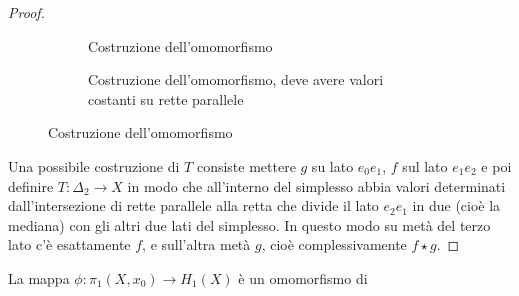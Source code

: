 \begin{proof}
\begin{figure}[htbp]
\begin{subfigure}[htbp]{.45\linewidth}
      \caption{Costruzione dell'omomorfismo}
      \label{fig:lez3:proof_homo_1}
    \end{subfigure}
    \begin{subfigure}[htbp]{.45\linewidth}
      \centering
      \caption{Costruzione dell'omomorfismo, deve avere valori costanti su rette parallele}
      \label{fig:lez3:proof_homo}
    \end{subfigure}
    \caption{Costruzione dell'omomorfismo}
  \end{figure}
  Una possibile costruzione di $ T $ consiste mettere $ g $ su lato $ e_0 e_1 $,
  $ f $ sul lato $ e_1 e_2 $ e poi definire $ T \colon \Delta_2 \to X $ in modo che all'interno
  del simplesso abbia valori determinati dall'intersezione di rette parallele alla
  retta che divide il lato $ e_2 e_1 $ in due (cioè la mediana) con gli altri due
  lati del simplesso. In questo modo su metà del terzo lato c'è esattamente $ f $,
  e sull'altra metà $ g $, cioè complessivamente $ f \star g $.
\end{proof}
\hfill \newline \newline \noindent La mappa $ \phi: \pi_1(X,x_0) \to H_1(X) $ è un omomorfismo di
